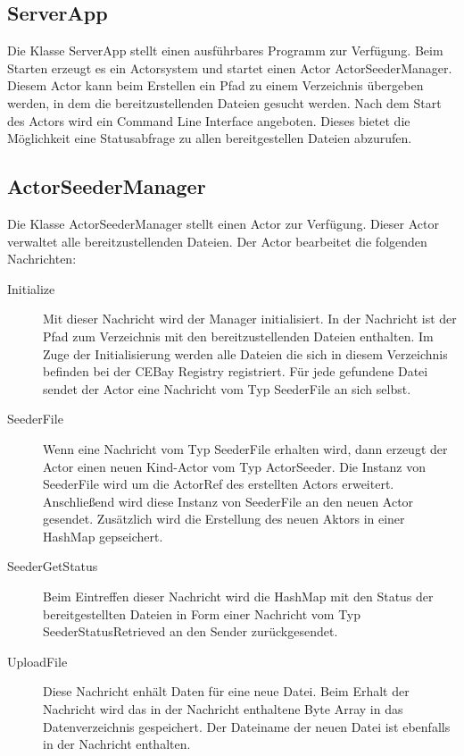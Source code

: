 \documentclass{scrartcl}
\begin{document}
\subsection{ServerApp}
\label{sec:org991ff42}
Die Klasse ServerApp stellt einen ausführbares Programm zur
Verfügung. Beim Starten erzeugt es ein Actorsystem und startet einen
Actor ActorSeederManager. Diesem Actor kann beim Erstellen ein Pfad zu
einem Verzeichnis übergeben werden, in dem die bereitzustellenden
Dateien gesucht werden. Nach dem Start des Actors wird ein Command
Line Interface angeboten. Dieses bietet die Möglichkeit eine
Statusabfrage zu allen bereitgestellen Dateien abzurufen.

\subsection{ActorSeederManager}
\label{sec:org18483df}
Die Klasse ActorSeederManager stellt einen Actor zur Verfügung. Dieser
Actor verwaltet alle bereitzustellenden Dateien. Der Actor bearbeitet
die folgenden Nachrichten:

\begin{description}
\item[{Initialize}] Mit dieser Nachricht wird der Manager
initialisiert. In der Nachricht ist der Pfad zum Verzeichnis mit
den bereitzustellenden Dateien enthalten. Im Zuge der
Initialisierung werden alle Dateien die sich in diesem
Verzeichnis befinden bei der CEBay Registry registriert. Für jede
gefundene Datei sendet der Actor eine Nachricht vom Typ SeederFile an
sich selbst.
\item[{SeederFile}] Wenn eine Nachricht vom Typ SeederFile erhalten wird,
dann erzeugt der Actor einen neuen Kind-Actor vom Typ
ActorSeeder. Die Instanz von SeederFile wird um die ActorRef des
erstellten Actors erweitert. Anschließend wird diese Instanz von
SeederFile an den neuen Actor gesendet. Zusätzlich wird die
Erstellung des neuen Aktors in einer HashMap gepseichert.
\item[{SeederGetStatus}] Beim Eintreffen dieser Nachricht wird die HashMap
mit den Status der bereitgestellten Dateien in Form einer
Nachricht vom Typ SeederStatusRetrieved an den Sender zurückgesendet.
\item[{UploadFile}] Diese Nachricht enhält Daten für eine neue Datei. Beim
Erhalt der Nachricht wird das in der Nachricht enthaltene Byte
Array in das Datenverzeichnis gespeichert. Der Dateiname der
neuen Datei ist ebenfalls in der Nachricht enthalten.
\end{description}
\end{document}
